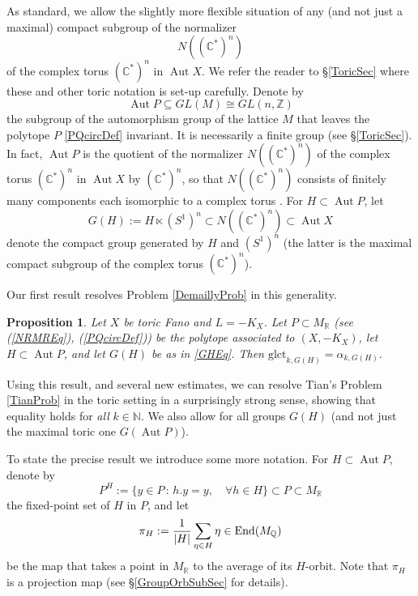 \documentclass{article}
\newcommand{\glct}{\mathrm{glct}}
\newcommand{\CC}{\mathbb {C}}
\newcommand{\NN}{{\mathbb N}}
\newcommand{\QQ}{{\mathbb Q}}
\newcommand{\RR}{{\mathbb R}}
\newcommand{\ZZ}{{\mathbb Z}}
\renewcommand{\>}{\rightarrow}
\DeclareMathOperator{\Aut}{Aut}
\theoremstyle{plain}
\newtheorem{proposition}[theorem]{Proposition}
\theoremstyle{definition}
\newcommand{\beq}{\begin{equation}}
\newcommand{\eeq}{\end{equation}}
\newcommand{\bprop}{\begin{proposition}}
\newcommand{\eprop}{\end{proposition}}
\def\lb#1{\label{#1}}
\begin{document}
As standard, we allow the slightly more flexible situation
of any (and not just a maximal) compact subgroup of the normalizer
$$N((\CC^*)^n)$$
of the complex torus $(\CC^*)^n$ in $\Aut X$.
We refer the reader to \S\ref{ToricSec} where these and other 
toric notation is set-up carefully.
Denote 
by 
\beq
\lb{AutPEq}
\Aut P\subseteq GL(M)\cong GL(n,\ZZ)
\eeq
the subgroup of the automorphism group of the lattice $M$ that leaves the polytope $P$ \eqref{PQcircDef} invariant.
It is necessarily a finite group (see \S\ref{ToricSec}).
In fact, $\Aut P$ is the quotient of the normalizer $N((\CC^*)^n)$ of the
complex torus $(\CC^*)^n$ in $\Aut X$ by $(\CC^*)^n$, so that 
$N((\CC^*)^n)$  consists
of finitely many components each isomorphic to a complex torus \cite[Proposition 3.1]{BS99}.
For $H\subset\Aut P$, 
let 
\beq
\lb{GHEq}
G(H):=H\ltimes(S^1)^n\subset N((\CC^*)^n)\subset\Aut X
\eeq
denote the compact group generated by $H$ and $(S^1)^n$
(the latter is the maximal compact subgroup of the complex torus $(\CC^*)^n$).

Our first result resolves Problem \ref{DemaillyProb}
in this generality.

\bprop
\lb{DemaillyProblemProp}
Let $X$  be toric Fano and $L=-K_X$. Let $P\subset M_\RR$   
(see (\ref{NRMREq}), (\ref{PQcircDef})) be the polytope associated to $(X,-K_X)$, 
let
    $H\subset\Aut P$, and let $G(H)$ be as in \eqref{GHEq}.
Then
$
\glct_{k,G(H)}
=\alpha_{k,G(H)}.
$
\eprop

Using this result, and several new estimates, we can resolve Tian's 
Problem \ref{TianProb} in the toric setting in a surprisingly strong sense,
showing that equality holds
for {\it all} $k\in\NN$. We also allow for all groups $G(H)$
(and not just the maximal toric one $G(\Aut P)$).

To state the precise result we introduce some more notation. 
For $H\subset\Aut P$, denote by 
\beq\lb{PHEq}
P^H:=\big\{y\in P\,:\, h.y=y, \quad \forall h\in H\big\}\subset P\subset M_\RR
\eeq
the fixed-point set of $H$ in $P$, and
let 
\begin{equation}\label{definition of p}
    \pi_H:=\frac{1}{|H|}\sum_{\eta\in H}\eta\in
    \hbox{End}(M_\QQ)
\end{equation}
be the map that takes a point in $M_\RR$ to the average of its $H$-orbit. 
Note that $\pi_H$ is a projection map (see \S\ref{GroupOrbSubSec} for details).
 
\end{document}
